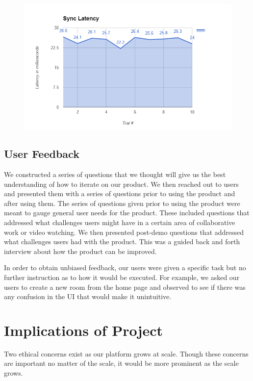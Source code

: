 \documentclass[conference]{IEEEtran}
\begin{document}
    \begin{figure}[H]
      \centering
      \includegraphics[width=\linewidth]{figure4.PNG}
      \caption{}
      \label{fig:my_label}
    \end{figure}

\subsection{User Feedback}
    We constructed a series of questions that we thought will give us the best understanding of how to iterate on our product. We then reached out to users and presented them with a series of questions prior to using the product and after using them. The series of questions given prior to using the product were meant to gauge general user needs for the product. These included questions that addressed what challenges users might have in a certain area of collaborative work or video watching. We then presented post-demo questions that addressed what challenges users had with the product. This was a guided back and forth interview about how the product can be improved.

    In order to obtain unbiased feedback, our users were given a specific task but no further instruction as to how it would be executed. For example, we asked our users to create a new room from the home page and observed to see if there was any confusion in the UI that would make it unintuitive.

\section{Implications of Project}

    Two ethical concerns exist as our platform grows at scale. Though these concerns are important no matter of the scale, it would be more prominent as the scale grows.
\end{document}
